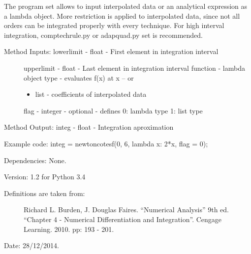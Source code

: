 \documentclass[letterpaper,10pt,oneside]{sphinxmanual}
\theoremstyle{plain}%
\theoremstyle{definition}%
\theoremstyle{remark}%
\begin{document}
The program set allows to input interpolated data or an analytical expression
as a lambda object. More restriction is applied to interpolated data, since
not all orders can be integrated properly with every technique. For high 
interval integration, comptechrule.py or adapquad.py set is recommended.
\begin{description}
\item[{Method Inputs: lowerlimit - float - First element in integration interval}] \leavevmode
upperlimit - float - Last element in integration interval
function - lambda object type - evaluates f(x) at x -- or
\begin{itemize}
\item {} 
list - coefficients of interpolated data

\end{itemize}

flag - integer - optional - defines 0: lambda type 1: list type

\end{description}

Method Output: integ - float - Integration aproximation

Example code: integ = newtoncotesf(0, 6, lambda x: 2*x, flag = 0);

Dependencies: None.

Version: 1.2 for Python 3.4
\begin{description}
\item[{Definitions are taken from:}] \leavevmode
Richard L. Burden, J. Douglas Faires. ``Numerical Analysis'' 9th ed.
``Chapter 4 - Numerical Differentiation and Integration''. 
Cengage Learning. 2010. pp: 193 - 201.

\end{description}




Date: 28/12/2014.
\end{document}
